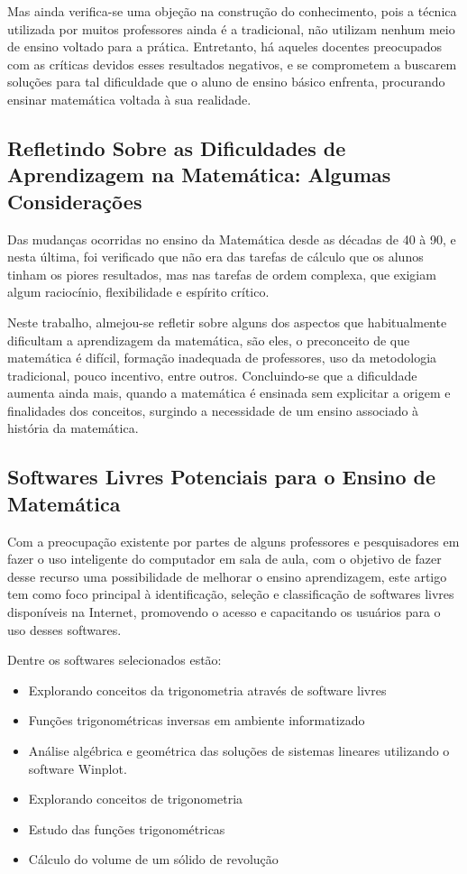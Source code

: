 \documentclass[12pt,a4paper]{article}
\begin{document}
Mas ainda verifica-se uma objeção na construção do conhecimento, pois a técnica utilizada por muitos professores ainda é a tradicional, não utilizam nenhum meio de ensino voltado para a prática. Entretanto, há aqueles docentes preocupados com as críticas devidos esses resultados negativos, e se comprometem a buscarem soluções para tal dificuldade que o aluno de ensino básico enfrenta, procurando ensinar matemática voltada à sua realidade.\citep{santos2008ensino} 

\subsection{Refletindo Sobre as Dificuldades de Aprendizagem na Matemática: Algumas Considerações}
Das mudanças ocorridas no ensino da Matemática desde as décadas de 40 à 90, e nesta última, foi verificado que não era das tarefas de cálculo que os alunos tinham os piores resultados, mas nas tarefas de ordem complexa, que exigiam algum raciocínio, flexibilidade e espírito crítico.

Neste trabalho, almejou-se refletir sobre alguns dos aspectos que habitualmente dificultam a aprendizagem da matemática, são eles, o preconceito de que matemática é difícil, formação inadequada de professores, uso da metodologia tradicional, pouco incentivo, entre outros. Concluindo-se que a dificuldade aumenta ainda mais, quando a matemática é ensinada sem explicitar a origem e finalidades dos conceitos, surgindo a necessidade de um ensino associado à história da matemática.\citep{silva2005refletindo}

\subsection{Softwares Livres Potenciais para o Ensino de Matemática}
Com a preocupação existente por partes de alguns professores e pesquisadores em fazer o uso inteligente do computador em sala de aula, com o objetivo de fazer desse recurso uma possibilidade de melhorar o ensino aprendizagem, este artigo tem como foco principal à identificação, seleção e classificação de softwares livres disponíveis na Internet, promovendo o acesso e capacitando os usuários para o uso desses softwares. 

Dentre os softwares selecionados estão:
\begin{itemize}
	\item Explorando conceitos da trigonometria através de software livres
	\item Funções trigonométricas inversas em ambiente informatizado
	\item Análise algébrica e geométrica das soluções de sistemas lineares utilizando o software Winplot.
	\item Explorando conceitos de trigonometria
	\item Estudo das funções trigonométricas
	\item Cálculo do volume de um sólido de revolução\citep{dosciatisoftwares}
\end{itemize}
\end{document}
